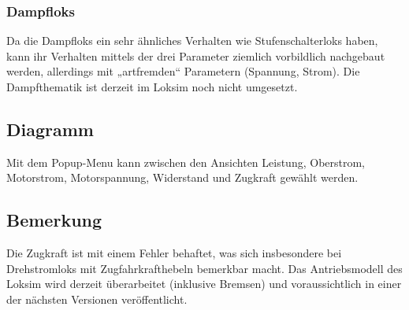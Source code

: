 \subsubsection{Dampfloks}
Da die Dampfloks ein sehr ähnliches Verhalten wie Stufenschalterloks haben, kann ihr Verhalten mittels der drei Parameter ziemlich vorbildlich nachgebaut werden, allerdings mit „artfremden“ Parametern (Spannung, Strom). Die Dampfthematik ist derzeit im Loksim noch nicht umgesetzt.

\subsection{Diagramm}
Mit dem Popup-Menu kann zwischen den Ansichten Leistung, Oberstrom, Motorstrom,  Motorspannung, Widerstand und Zugkraft gewählt werden.

\subsection{Bemerkung}
Die Zugkraft ist mit einem Fehler behaftet, was sich insbesondere bei Drehstromloks mit Zugfahrkrafthebeln bemerkbar macht. Das Antriebsmodell des Loksim wird derzeit überarbeitet (inklusive Bremsen) und voraussichtlich in einer der nächsten Versionen veröffentlicht.

